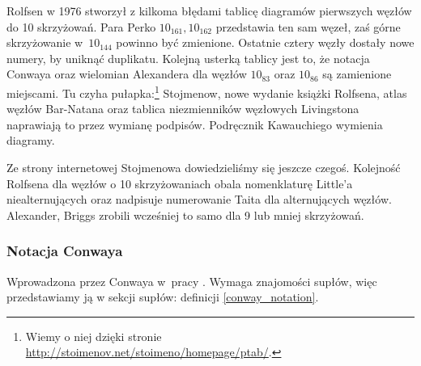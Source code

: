 Rolfsen w 1976 stworzył z kilkoma błędami tablicę diagramów pierwszych węzłów do 10 skrzyżowań.
Para Perko $10_{161}, 10_{162}$ przedstawia ten sam węzeł, zaś górne skrzyżowanie w~$10_{144}$ powinno być zmienione.
Ostatnie cztery węzły dostały nowe numery, by uniknąć duplikatu.
Kolejną usterką tablicy jest to, że notacja Conwaya oraz wielomian Alexandera dla węzłów $10_{83}$ oraz $10_{86}$ są zamienione miejscami.
Tu czyha pułapka:\footnote{Wiemy o niej dzięki stronie \url{http://stoimenov.net/stoimeno/homepage/ptab/}.} Stojmenow, nowe wydanie książki Rolfsena, atlas węzłów Bar-Natana oraz tablica niezmienników węzłowych Livingstona naprawiają to przez wymianę podpisów.
Podręcznik Kawauchiego wymienia diagramy.

Ze strony internetowej Stojmenowa dowiedzieliśmy się jeszcze czegoś.
Kolejność Rolfsena dla węzłów o 10 skrzyżowaniach obala nomenklaturę Little'a niealternujących oraz nadpisuje numerowanie Taita dla alternujących węzłów.
Alexander, Briggs zrobili wcześniej to samo dla 9 lub mniej skrzyżowań.

%

\subsubsection{Notacja Conwaya}
%
Wprowadzona przez Conwaya w~pracy \cite{conway70}.
Wymaga znajomości supłów, więc przedstawiamy ją w sekcji supłów: definicji \ref{conway_notation}.

